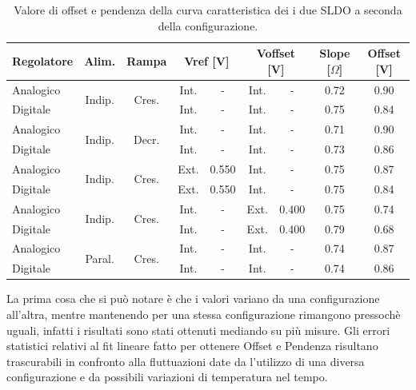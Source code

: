 \begin{center}
\begin{table}

\begin{tabular}{|l|c|c|c|c|c|c|c|c|}
\hline
Regolatore & Alim. & Rampa & \multicolumn{2}{c|}{Vref [V]} & \multicolumn{2}{c|}{Voffset [V]} & Slope [$\Omega$] & Offset [V]\\ \hline
 
Analogico & \multirow{2}{*}{Indip.} & \multirow{2}{*}{Cres.} & Int. & - & Int. & - & 0.72 & 0.90 \\
Digitale  &  &  & Int. & - & Int. & - & 0.75  & 0.84 \\ \hline

Analogico & \multirow{2}{*}{Indip.} & \multirow{2}{*}{Decr.} & Int. & - & Int. & - & 0.71 & 0.90 \\
Digitale  &  &  & Int. & - & Int. & - & 0.73  & 0.86 \\ \hline

Analogico & \multirow{2}{*}{Indip.} & \multirow{2}{*}{Cres.} & Ext. & 0.550 & Int. & - & 0.75 & 0.87 \\
Digitale  &  &  & Ext. & 0.550 & Int. & - & 0.75  & 0.84 \\ \hline

Analogico & \multirow{2}{*}{Indip.} & \multirow{2}{*}{Cres.} & Int. & - & Ext. & 0.400 & 0.75 & 0.74 \\
Digitale  &  &  & Int. & - & Ext. & 0.400 & 0.79  & 0.68 \\ \hline

Analogico & \multirow{2}{*}{Paral.} & \multirow{2}{*}{Cres.} & Int. & - & Int. & - & 0.74 & 0.87 \\
Digitale  &  &  & Int. & - & Int. & - & 0.74  & 0.86 \\ \hline
\end{tabular}
\caption{Valore di offset e pendenza della curva caratteristica dei i due SLDO a seconda della configurazione.}
\label{table:results}
\end{table}
\end{center}
La prima cosa che si può notare è che i valori variano da una configurazione all'altra, mentre mantenendo per una stessa configurazione rimangono pressochè uguali, infatti i risultati sono stati ottenuti mediando su più misure. Gli errori statistici relativi al fit lineare fatto per ottenere Offset e Pendenza risultano trascurabili in confronto alla fluttuazioni date da l'utilizzo di una diversa configurazione e da possibili variazioni di temperatura nel tempo. 

